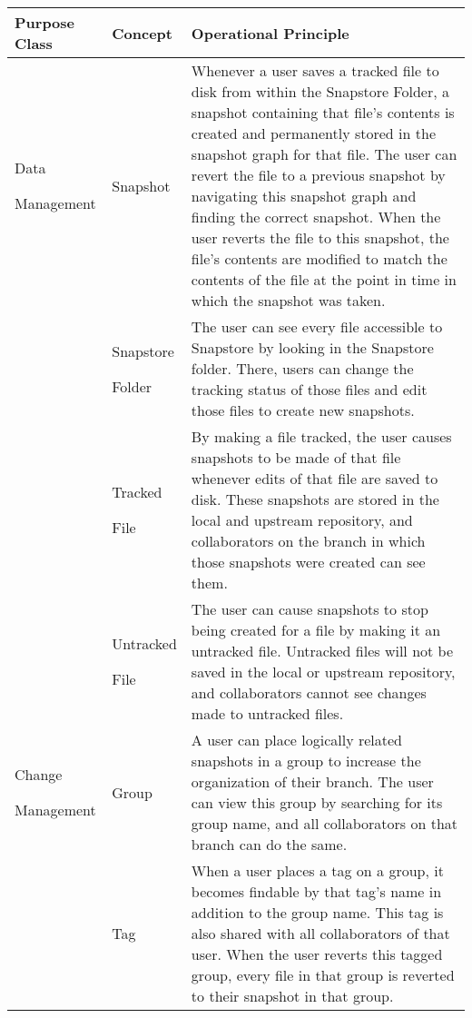 \begin{table}
\begin{tabular}{ |p{2.25cm}||p{2.25cm}||p{12.5cm}|}
 \hline
 \textbf{Purpose Class} & \textbf{Concept} & \textbf{Operational Principle}\\[8pt]
 \hline
 \parbox[t]{3cm}{Data \par Management\strut} & Snapshot & Whenever a user saves a tracked file to disk from within the Snapstore Folder, a snapshot containing that file's contents is created and permanently stored in the snapshot graph for that file. The user can revert the file to a previous snapshot by navigating this snapshot graph and finding the correct snapshot. When the user reverts the file to this snapshot, the file's contents are modified to match the contents of the file at the point in time in which the snapshot was taken.\\[8pt]
  & \parbox[t]{3cm}{Snapstore \par Folder\strut} & The user can see every file accessible to Snapstore by looking in the Snapstore folder. There, users can change the tracking status of those files and edit those files to create new snapshots.\\[8pt]
  & \parbox[t]{3cm}{Tracked \par File\strut} & By making a file tracked, the user causes snapshots to be made of that file whenever edits of that file are saved to disk. These snapshots are stored in the local and upstream repository, and collaborators on the branch in which those snapshots were created can see them.\\[8pt]
  & \parbox[t]{3cm}{Untracked \par File\strut} & The user can cause snapshots to stop being created for a file by making it an untracked file. Untracked files will not be saved in the local or upstream repository, and collaborators cannot see changes made to untracked files.\\[8pt]
 \hline
 \parbox[t]{3cm}{Change \par Management\strut} & Group & A user can place logically related snapshots in a group to increase the organization of their branch. The user can view this group by searching for its group name, and all collaborators on that branch can do the same.\\[8pt]
  & Tag & When a user places a tag on a group, it becomes findable by that tag's name in addition to the group name. This tag is also shared with all collaborators of that user. When the user reverts this tagged group, every file in that group is reverted to their snapshot in that group.\\[8pt]

\end{tabular}
\end{table}
